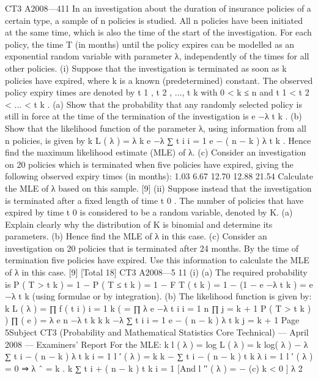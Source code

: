 \documentclass[a4paper,12pt]{article}
\begin{document}
\begin{enumerate}
CT3 A2008—411
In an investigation about the duration of insurance policies of a certain type, a sample
of n policies is studied. All n policies have been initiated at the same time, which is
also the time of the start of the investigation. For each policy, the time T (in months)
until the policy expires can be modelled as an exponential random variable with
parameter λ, independently of the times for all other policies.
(i)
Suppose that the investigation is terminated as soon as k policies have expired,
where k is a known (predetermined) constant. The observed policy expiry
times are denoted by t 1 , t 2 , ..., t k with 0 < k ≤ n and t 1 < t 2 < ... < t k .
(a) Show that the probability that any randomly selected policy is still in
force at the time of the termination of the investigation is e −λ t k .
(b) Show that the likelihood function of the parameter λ, using information
from all n policies, is given by
k
L ( λ ) = λ k e
−λ ∑ t i
i = 1
e − ( n − k ) λ t k .
Hence find the maximum likelihood estimate (MLE) of λ.
(c)
Consider an investigation on 20 policies which is terminated when five
policies have expired, giving the following observed expiry times (in
months):
1.03 6.67 12.70 12.88 21.54
Calculate the MLE of λ based on this sample.
[9]
(ii)
Suppose instead that the investigation is terminated after a fixed length of time
t 0 . The number of policies that have expired by time t 0 is considered to be a
random variable, denoted by K.
(a) Explain clearly why the distribution of K is binomial and determine its
parameters.
(b) Hence find the MLE of λ in this case.
(c) Consider an investigation on 20 policies that is terminated after 24
months. By the time of termination five policies have expired.
Use this information to calculate the MLE of λ in this case.
[9]
[Total 18]
CT3 A2008—5
11
(i)
(a)
The required probability is
P ( T > t k ) = 1 − P ( T ≤ t k ) = 1 − F T ( t k )
= 1 − (1 − e −λ t k ) = e −λ t k (using formulae or by integration).
(b)
The likelihood function is given by:
k
L ( λ ) = ∏ f ( t i )
i = 1
k
(
= ∏ λ e −λ t i
i = 1
n
∏
j = k + 1
P ( T > t k )
) ∏ ( e ) = λ e
n
−λ t k
k
k
−λ ∑ t i
i = 1
e − ( n − k ) λ t k
j = k + 1
Page 5Subject CT3 (Probability and Mathematical Statistics Core Technical) — April 2008 — Examiners’ Report
For the MLE:
k
l ( λ ) = log L ( λ ) = k log( λ ) − λ ∑ t i − ( n − k ) λ t k
i = 1
l ′ ( λ ) =
k k
− ∑ t i − ( n − k ) t k
λ i = 1
l ′ ( λ ) = 0 ⇒ λ ˆ =
k
.
k
∑ t i + ( n − k ) t k
i = 1
[And l ′′ ( λ ) = −
(c)
k
< 0 ]
λ 2

\end{enumerate}
\end{document}
